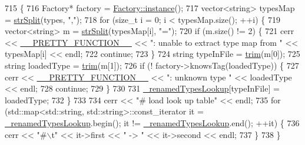 \begin{DoxyCode}
715 \{
716   Factory* factory = \hyperlink{classg2o_1_1Factory_a8a1f33e017c5ad59399cef48972578ae}{Factory::instance}();
717   vector<string> typesMap = \hyperlink{group__utils_ga8e1ffa60787d006502c7c94f5646c598}{strSplit}(types, \textcolor{stringliteral}{","});
718   \textcolor{keywordflow}{for} (\textcolor{keywordtype}{size\_t} i = 0; i < typesMap.size(); ++i) \{
719     vector<string> m = \hyperlink{group__utils_ga8e1ffa60787d006502c7c94f5646c598}{strSplit}(typesMap[i], \textcolor{stringliteral}{"="});
720     \textcolor{keywordflow}{if} (m.size() != 2) \{
721       cerr << \hyperlink{macros_8h_a9c15fe1e91b07ea3280f5239f9841b67}{\_\_PRETTY\_FUNCTION\_\_} << \textcolor{stringliteral}{": unable to extract type map from "} << typesMap[i]
       << endl;
722       \textcolor{keywordflow}{continue};
723     \}
724     \textcolor{keywordtype}{string} typeInFile = \hyperlink{group__utils_ga5c3812993227cfbec772c7477928c1fc}{trim}(m[0]);
725     \textcolor{keywordtype}{string} loadedType = \hyperlink{group__utils_ga5c3812993227cfbec772c7477928c1fc}{trim}(m[1]);
726     \textcolor{keywordflow}{if} (! factory->knowsTag(loadedType)) \{
727       cerr << \hyperlink{macros_8h_a9c15fe1e91b07ea3280f5239f9841b67}{\_\_PRETTY\_FUNCTION\_\_} << \textcolor{stringliteral}{": unknown type "} << loadedType << endl;
728       \textcolor{keywordflow}{continue};
729     \}
730 
731     \hyperlink{structg2o_1_1OptimizableGraph_a726ab6d0b04b12f835b690d54e061731}{\_renamedTypesLookup}[typeInFile] = loadedType;
732   \}
733 
734   cerr << \textcolor{stringliteral}{"# load look up table"} << endl;
735   \textcolor{keywordflow}{for} (std::map<std::string, std::string>::const\_iterator it = 
      \hyperlink{structg2o_1_1OptimizableGraph_a726ab6d0b04b12f835b690d54e061731}{\_renamedTypesLookup}.begin(); it != \hyperlink{structg2o_1_1OptimizableGraph_a726ab6d0b04b12f835b690d54e061731}{\_renamedTypesLookup}.end(); ++it) \{
736     cerr << \textcolor{stringliteral}{"#\(\backslash\)t"} << it->first << \textcolor{stringliteral}{" -> "} << it->second << endl;
737   \}
738 \}
\end{DoxyCode}
